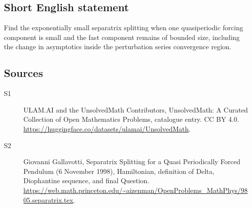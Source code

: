 \documentclass[11pt]{article}
\begin{document}
\subsection{Short English statement}
Find the exponentially small separatrix splitting when one quasiperiodic forcing component is small and the fast component remains of bounded size, including the change in asymptotics inside the perturbation series convergence region.
\subsection{Sources}
\begin{description}
\item[\hypertarget{source:statement:1}{S1}] ULAM.AI and the UnsolvedMath Contributors, UnsolvedMath: A Curated Collection of Open Mathematics Problems, catalogue entry. CC BY 4.0. \url{https://huggingface.co/datasets/ulamai/UnsolvedMath}.
\item[\hypertarget{source:statement:2}{S2}] Giovanni Gallavotti, Separatrix Splitting for a Quasi Periodically Forced Pendulum (6 November 1998), Hamiltonian, definition of Delta, Diophantine sequence, and final Question. \url{https://web.math.princeton.edu/~aizenman/OpenProblems_MathPhys/9805.separatrix.tex}.
\end{description}
\label{end:statement}
\end{document}

